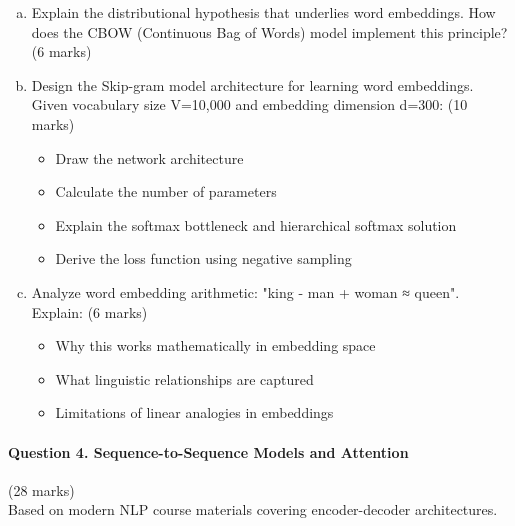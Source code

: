 \documentclass[12pt]{article}
\newcommand{\mediumanswer}{\vspace{3cm}}
\newcommand{\journalspace}{\vspace{4.5cm}}
\begin{document}
\begin{enumerate}[(a)]
    \item Explain the distributional hypothesis that underlies word embeddings. How does the CBOW (Continuous Bag of Words) model implement this principle? \hfill (6 marks)
    
    \mediumanswer
    
    \item Design the Skip-gram model architecture for learning word embeddings. Given vocabulary size V=10,000 and embedding dimension d=300: \hfill (10 marks)
    \begin{itemize}
        \item Draw the network architecture
        \item Calculate the number of parameters
        \item Explain the softmax bottleneck and hierarchical softmax solution
        \item Derive the loss function using negative sampling
    \end{itemize}
    
    \journalspace
    
    \item Analyze word embedding arithmetic: "king - man + woman ≈ queen". Explain: \hfill (6 marks)
    \begin{itemize}
        \item Why this works mathematically in embedding space
        \item What linguistic relationships are captured
        \item Limitations of linear analogies in embeddings
    \end{itemize}
    
    \mediumanswer
\end{enumerate}

\newpage
\paragraph{Question 4. Sequence-to-Sequence Models and Attention}\hfill (28 marks)\\
Based on modern NLP course materials covering encoder-decoder architectures.
\end{document}
